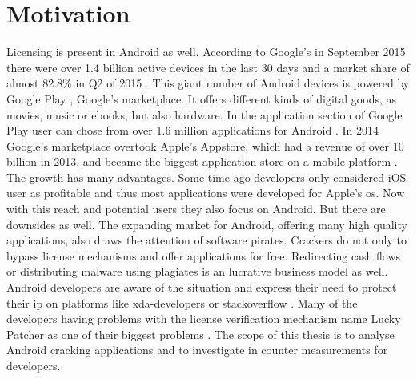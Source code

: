 \section{Motivation}\label{subsection:introduction-motivation}
Licensing is present in Android as well.
According to Google's in September 2015 there were over 1.4 billion active devices in the last 30 days and a market share of almost 82.8\% in Q2 of 2015 \cite{androidDevices}\cite{androidShare}.
This giant number of Android devices is powered by Google Play \cite{googlePlay}, Google's marketplace.
It offers different kinds of digital goods, as movies, music or ebooks, but also hardware.
In the application section of Google Play user can chose from over 1.6 million applications for Android \cite{statistaAppStore}.
In 2014 Google's marketplace overtook Apple's Appstore, which had a revenue of over 10 billion in 2013, and became the biggest application store on a mobile platform \cite{wiwoValue}.
\newline
The growth has many advantages.
Some time ago developers only considered iOS user as profitable and thus most applications were developed for Apple's \gls{os}.
Now with this reach and potential users they also focus on Android\cite{businessProfit}.
But there are downsides as well.
The expanding market for Android, offering many high quality applications, also draws the attention of software pirates.
Crackers do not only to bypass license mechanisms and offer applications for free.
Redirecting cash flows or distributing malware using plagiates is an lucrative business model as well.
Android developers are aware of the situation \cite{developersPiracy} and express their need to protect their \gls{ip} on platforms like xda-developers \cite{xdaPiracy} or stackoverflow \cite{stackoverflowPiracy}.
Many of the developers having problems with the license verification mechanism name Lucky Patcher as one of their biggest problems \cite{stackoverflowLucky}.
\newline
\newline
The scope of this thesis is to analyse Android cracking applications and to investigate in counter measurements for developers.
